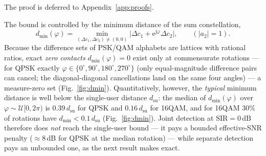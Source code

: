 \documentclass[journal]{IEEEtran}
\newcommand{\sir}{\mathrm{SIR}}
\newcommand{\ee}{\mathrm{e}}
\newcommand{\jj}{\mathrm{j}}
\begin{document}
The proof is deferred to Appendix~\ref{app:proofs}.

The bound is controlled by the minimum distance of the sum
constellation,
\begin{equation}
  d_{\min}(\varphi)
  = \min_{(\Delta c_1, \Delta c_2) \neq (0,0)}
    \big| \Delta c_1 + \ee^{\jj\varphi} \Delta c_2 \big|,
  \qquad (|a_2| = 1).
  \label{eq:dmin}
\end{equation}
Because the difference sets of PSK/QAM alphabets are lattices with
rational ratios, exact \emph{zero contacts} $d_{\min}(\varphi) = 0$
exist only at commensurate rotations --- for QPSK exactly
$\varphi \in \{0^\circ, 90^\circ, 180^\circ, 270^\circ\}$ (only
equal-magnitude difference pairs can cancel; the diagonal-diagonal
cancellations land on the same four angles) --- a measure-zero set
(Fig.~\ref{fig:dmin}). Quantitatively, however, the \emph{typical}
minimum distance is well below the single-user distance $d_{\mathrm{su}}$:
the median of $d_{\min}(\varphi)$ over $\varphi \sim \mathcal{U}[0,2\pi)$
is $0.39\, d_{\mathrm{su}}$ for QPSK and $0.16\, d_{\mathrm{su}}$ for
16QAM, and for 16QAM $30\%$ of rotations have
$d_{\min} < 0.1\, d_{\mathrm{su}}$ (Fig.~\ref{fig:dmin}). Joint
detection at $\sir = 0$\,dB therefore does \emph{not} reach the
single-user bound --- it pays a bounded effective-SNR penalty
($\approx 8$\,dB for QPSK at the median rotation) --- while separate
detection pays an unbounded one, as the next result makes exact.
\end{document}
